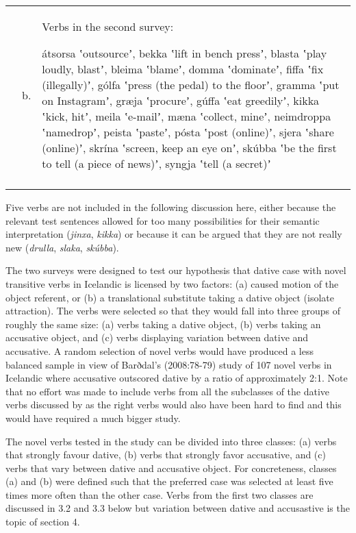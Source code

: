 \documentclass[output=paper,modfonts,nonflat]{langsci/langscibook}
\begin{document}
\tabletail{}
\tablelasttail{}
\begin{tabularx}{\textwidth}{XXX} & b. & Verbs in the second survey: 
\lsptoprule

átsorsa ʽoutsourceʼ, bekka ʽlift in bench pressʼ, blasta ʽplay loudly, blastʼ, bleima ʽblameʼ, domma ʽdominateʼ, fiffa ʽfix (illegally)ʼ, gólfa ʽpress (the pedal) to the floorʼ, gramma ʽput on Instagramʼ, græja ʽprocureʼ, gúffa ʽeat greedilyʼ, kikka ʽkick, hitʼ, meila ʽe-mailʼ, mæna ʽcollect, mineʼ, neimdroppa ʽnamedropʼ, peista ʽpasteʼ, pósta ʽpost (online)ʼ, sjera ʽshare (online)ʼ, skrína ʽscreen, keep an eye onʼ, skúbba ʽbe the first to tell (a piece of news)ʼ, syngja ʽtell (a secret)ʼ\\
\lspbottomrule
\end{tabularx}
Five verbs are not included in the following discussion here, either because the relevant test sentences allowed for too many possibilities for their semantic interpretation (\textit{jinxa}, \textit{kikka}) or because it can be argued that they are not really new  (\textit{drulla}, \textit{slaka}, \textit{skúbba}). 

\begin{styleFootnote}
The two surveys were designed to test our hypothesis that dative case with novel transitive verbs in Icelandic is licensed by two factors: (a) caused motion of the object referent, or (b) a translational substitute taking a dative object (isolate attraction). The verbs were selected so that they would fall into three groups of roughly the same size: (a) verbs taking a dative object, (b) verbs taking an accusative object, and (c) verbs displaying variation between dative and accusative. A random selection of novel verbs would have produced a less balanced sample in view of Barðdal’s (2008:78-79) study of 107 novel verbs in Icelandic where accusative outscored dative by a ratio of approximately 2:1. Note that no effort was made to include verbs from all the subclasses of the dative verbs discussed by \citet{Maling2002} as the right verbs would also have been hard to find and this would have required a much bigger study.
\end{styleFootnote}

The novel verbs tested in the study can be divided into three classes: (a) verbs that strongly favour dative, (b) verbs that strongly favor accusative, and (c) verbs that vary between dative and accusative object. For concreteness, classes (a) and (b) were defined such that the preferred case was selected at least five times more often than the other case. Verbs from the first two classes are discussed in 3.2 and 3.3 below but variation between dative and accusastive is the topic of section 4.
\end{document}
